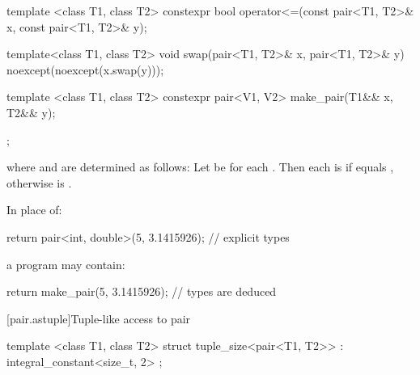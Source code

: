 %
\begin{itemdecl}
template <class T1, class T2>
  constexpr bool operator<=(const pair<T1, T2>& x, const pair<T1, T2>& y);
\end{itemdecl}

\begin{itemdescr}
\pnum
\returns {}
\end{itemdescr}


%
\begin{itemdecl}
template<class T1, class T2> void swap(pair<T1, T2>& x, pair<T1, T2>& y)
  noexcept(noexcept(x.swap(y)));
\end{itemdecl}

\begin{itemdescr}
\pnum
\effects {}
\end{itemdescr}

%
\begin{itemdecl}
template <class T1, class T2>
  constexpr pair<V1, V2> make_pair(T1&& x, T2&& y);
\end{itemdecl}

\begin{itemdescr}
\pnum
\returns {};

where  and  are determined as follows: Let  be
 for each . Then each  is 
if  equals , otherwise  is
.

\pnum
\enterexample
In place of:

\begin{codeblock}
  return pair<int, double>(5, 3.1415926);   // explicit types
\end{codeblock}

a \Cpp program may contain:

\begin{codeblock}
  return make_pair(5, 3.1415926);           // types are deduced
\end{codeblock}
\exitexample
\end{itemdescr}

[pair.astuple]{Tuple-like access to pair}

%
\begin{itemdecl}
template <class T1, class T2>
struct tuple_size<pair<T1, T2>>
  : integral_constant<size_t, 2> { };
\end{itemdecl}

